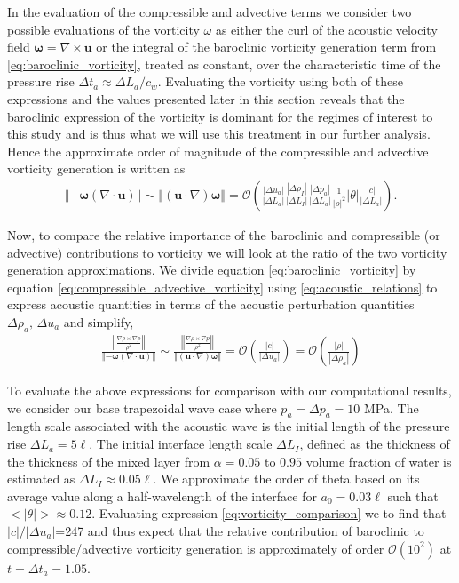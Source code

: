 \documentclass{article}
\newcommand{\orderof}[1]{\ensuremath{\mathcal{O}\left(#1\right)}}
\newcommand{\abs}[1]{\ensuremath{\left|#1\right|}}
\newcommand{\norm}[1]{\ensuremath{\left\Vert#1\right\Vert}}
\begin{document}
In the evaluation of the compressible and advective terms we consider
two possible evaluations of the vorticity $\omega$ as either the curl
of the acoustic velocity field
$\boldsymbol{\omega}=\nabla\times\boldsymbol{u}$ or the integral of
the baroclinic vorticity generation term from
\eqref{eq:baroclinic_vorticity}, treated as constant, over the
characteristic time of the pressure rise
$\Delta t_a\approx\Delta L_a/c_w$. Evaluating the vorticity using both
of these expressions and the values presented later in this section
reveals that the baroclinic expression of the vorticity is dominant
for the regimes of interest to this study and is thus what we will use
this treatment in our further analysis. Hence the approximate order of magnitude of the compressible and
advective vorticity generation is written as
\begin{align}
  \label{eq:compressible_advective_vorticity}%
  \norm{-\boldsymbol{\omega}\left(\nabla\cdot\boldsymbol{u}\right)}\sim \norm{\left(\boldsymbol{u}\cdot\nabla\right)\boldsymbol{\omega}} = %
  \orderof{%
  \frac{\abs{\Delta u_a}}{\abs{\Delta L_a}} \frac{\abs{\Delta \rho_I}}{\abs{\Delta L_I}}%
  \frac{\abs{\Delta p_a}}{\abs{\Delta L_a}} \frac{1}{\abs{\rho}^2}\abs{\theta}\frac{\abs{c}}{\abs{\Delta L_a}}%
  }.%
\end{align}

Now, to compare the relative importance of the baroclinic and
compressible (or advective) contributions to vorticity we will look at
the ratio of the two vorticity generation approximations. We divide
equation \eqref{eq:baroclinic_vorticity} by equation
\eqref{eq:compressible_advective_vorticity} using
\eqref{eq:acoustic_relations} to express acoustic quantities in terms
of the acoustic perturbation quantities $\Delta \rho_a,\,\Delta u_a$ and simplify,
\begin{align} \label{eq:vorticity_comparison}
  \frac{\norm{\frac{\nabla\rho\times\nabla
  p}{\rho^2}}}{\norm{-\boldsymbol{\omega}\left(\nabla\cdot\boldsymbol{u}\right)}}
  \sim
  \frac{\norm{\frac{\nabla\rho\times\nabla
  p}{\rho^2}}}{\norm{\left(\boldsymbol{u}\cdot\nabla\right)\boldsymbol{\omega}}}
  = \orderof{\frac{\abs{c}}{\abs{\Delta u_a}}} = \orderof{\frac{\abs{\rho}}{\abs{\Delta \rho_a}}}%
\end{align}

To evaluate the above expressions for comparison with our
computational results, we consider our base trapezoidal wave case
where $p_a = \Delta p_a = 10$ MPa. The length scale associated with
the acoustic wave is the initial length of the pressure rise
$\Delta L_a=5\ell$. The initial interface length scale
$\Delta L_I$, defined as the thickness of the thickness of the mixed
layer from $\alpha=0.05$ to $0.95$ volume fraction of water is estimated
as $\Delta L_I \approx 0.05\ell$. We approximate the order of theta
based on its average value along a half-wavelength of the interface
for $a_0=0.03\ell$ such that
$<\abs{\theta}>\approx0.12$. Evaluating expression
\eqref{eq:vorticity_comparison} we to find that
$\abs{c}/\abs{\Delta u_a}$=247 and thus expect that the relative
contribution of baroclinic to compressible/advective vorticity
generation is approximately of order $\orderof{10^2}$ at
$t=\Delta t_a=1.05$.
\end{document}
